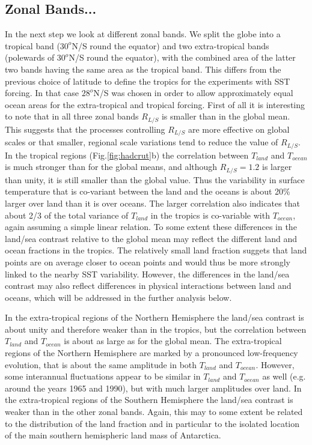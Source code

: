 
\subsection{Zonal Bands...}

In the next step we look at different zonal bands. We split the globe into a 
tropical band ($30^o$N/S round the equator) and two extra-tropical bands 
(polewards of $30^o$N/S round the equator), with the combined area of the latter 
two bands having the same area as the tropical band. This differs from the 
previous choice of latitude to define the tropics for the experiments with SST 
forcing. In that case $28^o$N/S was chosen in order to allow approximately equal 
ocean areas for the extra-tropical and tropical forcing. First of all it is 
interesting to note that in all three zonal bands $R_{L/S}$ is smaller than in 
the global mean. This suggests that the processes controlling $R_{L/S}$ are more 
effective on global scales or that smaller, regional scale variations tend to 
reduce the value of $R_{L/S}$. In the tropical regions
(Fig.\ref{fig:hadcrut}b) the correlation between $T_{land}$ and $T_{ocean}$ is 
much stronger than for the global means, and although $R_{L/S}=1.2$ is larger 
than unity, it is still smaller than the global value.  Thus the variability in 
surface temperature that is co-variant between the land and the oceans is about 
20\% larger over land than it is over oceans.  The larger correlation also 
indicates that about 2/3 of the total variance of $T_{land}$ in the tropics is 
co-variable with $T_{ocean}$, again assuming a simple linear relation. To some 
extent these differences in the land/sea contrast relative to the global mean 
may reflect the different land and ocean fractions in the tropics. The 
relatively small land fraction suggets that land points are on average closer to 
ocean points and would thus be more strongly linked to the nearby SST  
variability.  However, the differences in the land/sea contrast may also reflect 
differences in physical interactions between land and oceans, which will be 
addressed in the further analysis below.

In the extra-tropical regions of the Northern Hemisphere the land/sea contrast 
is about unity and therefore weaker than in the tropics, but the correlation 
between $T_{land}$ and $T_{ocean}$ is about as large as for the global mean.  
The extra-tropical regions of the Northern Hemisphere are marked by a pronounced 
low-frequency evolution, that is about the same amplitude in both $T_{land}$ and 
$T_{ocean}$. However, some interannual fluctuations appear to be similar in  
$T_{land}$ and $T_{ocean}$ as well (e.g. around the years 1965 and 1990), but 
with much larger amplitudes over land.  In the extra-tropical regions of the 
Southern Hemisphere the land/sea contrast is weaker than in the other zonal 
bands. Again, this may to some extent be related to the distribution of the land 
fraction and in particular to the isolated location of the main southern 
hemispheric land mass of Antarctica.


